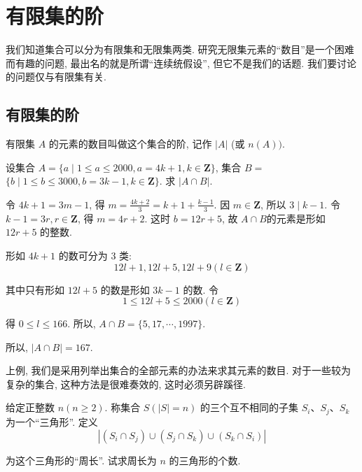 \section{有限集的阶}
我们知道集合可以分为有限集和无限集两类. 研究无限集元素的“数目”是一个困难而有趣的问题, 最出名的就是所谓“连续统假设”, 但它不是我们的话题. 我们要讨论的问题仅与有限集有关.
\subsection{有限集的阶}
有限集 $A$ 的元素的数目叫做这个集合的阶, 记作 $|A|$ (或 $n(A))$.
\begin{example}
	设集合 $A=\{a \mid 1 \leqslant a \leqslant 2000, a=4 k+1, k \in \mathbf{Z}\}$, 集合 $B=$ $\{b \mid 1 \leqslant b \leqslant 3000, b=3 k-1, k \in \mathbf{Z}\}$. 求 $|A \cap B|$.
\end{example}

\begin{analysis}
	令 $4 k+1=3 m-1$, 得 $m=\frac{4 k+2}{3}=k+1+\frac{k-1}{3}$. 因 $m \in \mathbf{Z}$, 所以 $3 \mid k-1$. 令 $k-1=3 r, r \in \mathbf{Z}$, 得 $m=4 r+2$. 这时 $b=12 r+5$, 故 $A \cap B$的元素是形如 $12 r+5$ 的整数.
\end{analysis}

\begin{solution}
	形如 $4 k+1$ 的数可分为 3 类:
	$$
		12 l+1,12 l+5,12 l+9(l \in \mathbf{Z})
	$$

	其中只有形如 $12 l+5$ 的数是形如 $3 k-1$ 的数. 令
	$$
		1 \leqslant 12 l+5 \leqslant 2000(l \in \mathbf{Z})
	$$

	得 $0 \leqslant l \leqslant 166$. 所以, $A \cap B=\{5,17, \cdots, 1997\}$.

	所以, $|A \cap B|=167$.
\end{solution}

\begin{note}
	上例, 我们是采用列举出集合的全部元素的办法来求其元素的数目. 对于一些较为复杂的集合, 这种方法是很难奏效的, 这时必须另辟蹊径.
\end{note}

\begin{example}
	给定正整数 $n(n \geqslant 2)$. 称集合 $S(|S|=n)$ 的三个互不相同的子集 $S_{i} 、 S_{j} 、 S_{k}$ 为一个“三角形”. 定义
	$$
		\left|\left(S_{i} \cap S_{j}\right) \cup\left(S_{j} \cap S_{k}\right) \cup\left(S_{k} \cap S_{i}\right)\right|
	$$

	为这个三角形的“周长”. 试求周长为 $n$ 的三角形的个数.
\end{example}

